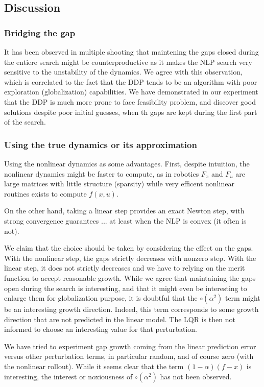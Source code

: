 \documentclass[10pt,a4paper]{article}
\begin{document}
\subsection{Discussion}

\subsubsection{Bridging the gap}
It has been observed in multiple shooting that maintening the gaps closed during the entiere search might be counterproductive as it makes the NLP search very sensitive to the unstability of the dynamics.
We agree with this observation, which is correlated to the fact that the DDP tends to be an algorithm with poor exploration (globalization) capabilities.
We have demonstrated in our experiment that the DDP is much more prone to face feasibility problem, and discover good solutions despite poor initial guesses, when th gaps are kept during the first part of the search.

\subsubsection{Using the true dynamics or its approximation}
Using the nonlinear dynamics as some advantages.
First, despite intuition, the nonlinear dynamics might be faster to compute, as in robotics $F_x$ and $F_u$ are large matrices with little structure (sparsity) while very efficent nonlinear routines exists to compute $f(x,u)$.

On the other hand, taking a linear step provides an exact Newton step, with strong convergence guarantees ... at least when the NLP is convex (it often is not).

We claim that the choice should be taken by considering the effect on the gaps.
With the nonlinear step, the gaps strictly decreases with nonzero step.
With the linear step, it does not strictly decreases and we have to relying on the merit function to accept reasonable growth.
While we agree that maintaining the gaps open during the search is interesting, and that it might even be interesting to enlarge them for globalization purpose, it is doubtful that the $\circ(\alpha^2)$ term might be an interesting growth direction.
Indeed, this term corresponds to some growth direction that are not predicted in the linear model.
The LQR is then not informed to choose an interesting value for that perturbation.

We have tried to experiment gap growth coming from the linear prediction error versus other perturbation terms, in particular random, and of course zero (with the nonlinear rollout).
While it seems clear that the term $(1-\alpha)(f-x)$ is interesting, the interest or noxiousness of $\circ(\alpha^2)$ has not been observed.
\end{document}
